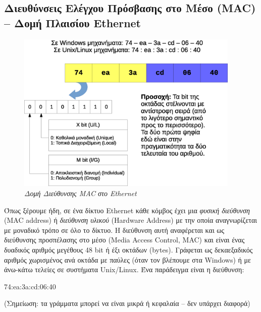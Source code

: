 %
%

\setcounter{subsection}{1}
\subsection{Διευθύνσεις Ελέγχου Πρόσβασης στο Μέσο (MAC) -- Δομή Πλαισίου Ethernet}

\begin{figure}[!ht]
  \centering
  \includegraphics[width=0.95\textwidth]{images/chapter2/2-3}
  \caption {\textsl{Δομή Διεύθυνσης MAC στο Ethernet}}
  \label{2-3}
\end{figure}

Όπως ξέρουμε ήδη, σε ένα δίκτυο Ethernet κάθε κόμβος έχει μια \emph{φυσική διεύθυνση} (MAC address) ή \emph{διεύθυνση υλικού} (Hardware Address) με την οποία αναγνωρίζεται με μοναδικό τρόπο σε όλο το δίκτυο. Η διεύθυνση αυτή αναφέρεται και ως διεύθυνσης προσπέλασης στο μέσο (Media Access Control, MAC) και είναι ένας δυαδικός αριθμός μεγέθους 48 bit ή έξι οκτάδων (bytes).
Γράφεται ως δεκαεξαδικός αριθμός χωρισμένος ανά οκτάδα με παύλες (όταν τον βλέπουμε στα Windows) ή με άνω-κάτω τελείες σε συστήματα Unix/Linux. Ένα παράδειγμα είναι η διεύθυνση:

\begin{center}
74:ea:3a:cd:06:40
\end{center}

(Σημείωση: τα γράμματα μπορεί να είναι μικρά ή κεφαλαία -- δεν υπάρχει διαφορά)

